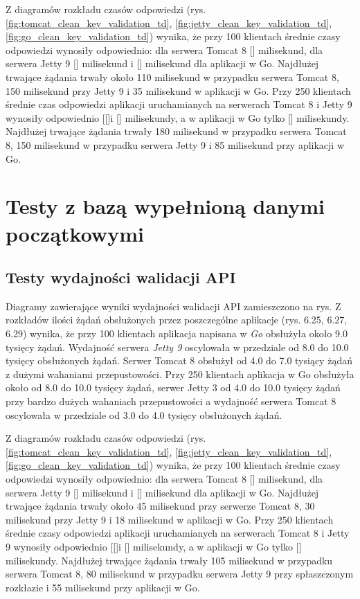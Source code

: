 Z diagramów rozkładu czasów odpowiedzi (rys. \ref{fig:tomcat_clean_key_validation_td}, \ref{fig:jetty_clean_key_validation_td}, \ref{fig:go_clean_key_validation_td}) wynika, że przy 100 klientach średnie czasy odpowiedzi wynosiły odpowiednio: dla serwera Tomcat 8 [] milisekund, dla serwera Jetty 9 [] milisekund i [] milisekund dla aplikacji w Go.  Najdłużej trwające żądania trwały około 110 milisekund w przypadku serwera Tomcat 8, 150 milisekund przy Jetty 9 i 35 milisekund  w aplikacji w Go. Przy 250 klientach średnie czas odpowiedzi aplikacji uruchamianych na serwerach Tomcat 8 i Jetty 9  wynosiły  odpowiednio [[]i [] milisekundy, a w aplikacji w Go tylko [] milisekundy. Najdłużej trwające żądania trwały 180 milisekund w przypadku serwera Tomcat 8, 150 milisekund w przypadku serwera Jetty 9 i 85 milisekund przy aplikacji w Go. 


\clearpage

\newpage
\section{Testy z bazą wypełnioną danymi początkowymi}
\subsection{Testy wydajności walidacji API}
Diagramy zawierające wyniki wydajności walidacji API zamieszczono na rys.
Z rozkładów ilości żądań obsłużonych przez poszczególne aplikacje (rys. 6.25, 6.27, 6.29) wynika, że przy 100 klientach aplikacja napisana w \textsl{Go} obsłużyła około 9.0 tysięcy żądań. Wydajność serwera  \textsl{Jetty 9} oscylowała w przedziale od 8.0 do 10.0 tysięcy obsłużonych żądań. Serwer Tomcat 8  obsłużył od 4.0 do 7.0 tysiący żądań z dużymi wahaniami przepustowości. Przy 250 klientach aplikacja w Go obsłużyła około od 8.0 do 10.0 tysięcy żądań, serwer Jetty 3 od 4.0 do 10.0 tysięcy żądań przy bardzo dużych wahaniach przepustowości a wydajność serwera Tomcat 8 oscylowała w przedziale od 3.0 do 4.0 tysięcy  obsłużonych żądań. 
 
Z diagramów rozkładu czasów odpowiedzi (rys. \ref{fig:tomcat_clean_key_validation_td}, \ref{fig:jetty_clean_key_validation_td}, \ref{fig:go_clean_key_validation_td}) wynika, że przy 100 klientach średnie czasy odpowiedzi wynosiły odpowiednio: dla serwera Tomcat 8 [] milisekund, dla serwera Jetty 9 [] milisekund i [] milisekund dla aplikacji w Go.  Najdłużej trwające żądania trwały około 45 milisekund przy serwerze Tomcat 8, 30 milisekund przy Jetty 9 i 18 milisekund  w aplikacji w Go. Przy 250 klientach średnie czasy odpowiedzi aplikacji uruchamianych na serwerach Tomcat 8 i Jetty 9  wynosiły odpowiednio [[]i [] milisekundy, a w aplikacji w Go tylko [] milisekundy. Najdłużej trwające żądania trwały 105 milisekund w przypadku serwera Tomcat 8, 80 milisekund w przypadku serwera Jetty 9 przy spłaszczonym rozkłazie i 55 milisekund przy aplikacji w Go. 

\clearpage

